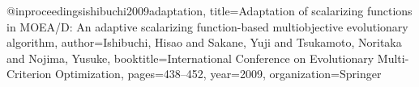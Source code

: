 @inproceedings{ishibuchi2009adaptation,
  title={Adaptation of scalarizing functions in MOEA/D: An adaptive scalarizing function-based multiobjective evolutionary algorithm},
  author={Ishibuchi, Hisao and Sakane, Yuji and Tsukamoto, Noritaka and Nojima, Yusuke},
  booktitle={International Conference on Evolutionary Multi-Criterion Optimization},
  pages={438--452},
  year={2009},
  organization={Springer}
}
